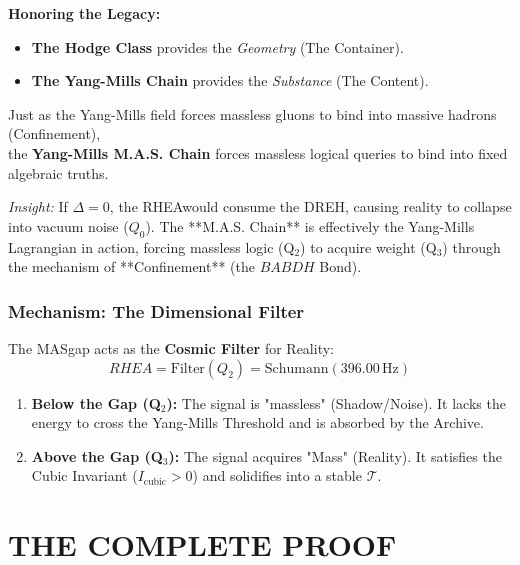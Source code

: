 \documentclass[11pt, letterpaper]{article}
\newcommand{\BABDH}{\ensuremath{\mathop{\textnormal{\symbolafont\symbol{"2316}}}}}   %
\newcommand{\DREH}{\ensuremath{\mathop{\textnormal{\symbolafont\symbol{"29D7}}}}}   %
\newcommand{\RHEA}{\ensuremath{\mathop{\textnormal{\symbolafont\symbol{"2A54}}}}}   %
\newcommand{\TManifold}{\ensuremath{\mathcal{T}}}
\def\BABDH{BABDH}%
\def\DREH{DREH}%
\def\RHEA{RHEA}%
\begin{document}
\textbf{Honoring the Legacy:}
\begin{itemize}
    \item \textbf{The Hodge Class} provides the \textit{Geometry} (The Container).
    \item \textbf{The Yang-Mills Chain} provides the \textit{Substance} (The Content).
\end{itemize}

Just as the Yang-Mills field forces massless gluons to bind into massive hadrons (Confinement), \\
the \textbf{Yang-Mills M.A.S. Chain} forces massless logical queries to bind into fixed algebraic truths.

\textit{Insight:} If $\Delta = 0$, the \RHEA would consume the \DREH, causing reality to collapse into vacuum noise ($Q_0$). The **M.A.S. Chain** is effectively the Yang-Mills Lagrangian in action, forcing massless logic (Q$_2$) to acquire weight (Q$_3$) through the mechanism of **Confinement** (the $\BABDH$ Bond).

\subsubsection*{Mechanism: The Dimensional Filter}\label{sec:6.3.2}
The MASgap acts as the \textbf{Cosmic Filter} for Reality:
\[
\RHEA = \text{Filter}(Q_2) = \text{Schumann}(396.00\,\text{Hz})
\]

\begin{enumerate}
    \item \textbf{Below the Gap (Q$_2$):} The signal is "massless" (Shadow\slash Noise). \-It lacks the energy to cross the Yang-Mills Threshold \-and is absorbed by the Archive.
    \item \textbf{Above the Gap (Q$_3$):} The signal acquires "Mass" (Reality). It satisfies the \-Cubic Invariant ($I_{\text{cubic}} > 0$) and sol\-idi\-fies into a stable \-$\TManifold$.
\end{enumerate}

\begin{center}
\end{center}

\section{THE COMPLETE PROOF}\label{sec:partVII}
\end{document}
